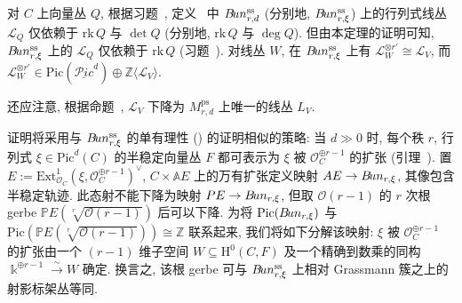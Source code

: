 \begin{remark}\label{src:9.4.37}
对 $C$ 上向量丛 $Q$, 根据习题~, 定义~ 中 $B\!un_{r,d}^{\mathrm{ss}}$ (分别地, $B\!un_{r,\xi}^{\mathrm{ss}}$) 上的行列式线丛 $\mathcal L_Q$ 仅依赖于 $\mathrm{rk}\,Q$ 与 $\det Q$ (分别地, $\mathrm{rk}\,Q$ 与 $\deg Q$). 但由本定理的证明可知, $B\!un_{r,\xi}^{\mathrm{ss}}$ 上的 $\mathcal L_Q$ 仅依赖于 $\mathrm{rk}\,Q$ (习题~). 对线丛 $W$, 在 $B\!un_{r,\xi}^{\mathrm{ss}}$ 上有 $\mathcal L_W^{\otimes r'}\cong\mathcal L_V$, 而 $\mathcal L_W^{\otimes r'}\in\mathrm{Pic}(\underline{\mathcal P\!ic}^d)\oplus\mathbb Z\langle\mathcal L_V\rangle$.
\end{remark}
还应注意, 根据命题~, $\mathcal L_V$ 下降为 $M_{r,d}^{\mathrm{ps}}$ 上唯一的线丛 $L_V$.

证明将采用与 $B\!un_{r,\xi}^{\mathrm{ss}}$ 的单有理性 () 的证明相似的策略: 当 $d\gg0$ 时, 每个秩 $r$, 行列式 $\xi\in\mathrm{Pic}^d(C)$ 的半稳定向量丛 $F$ 都可表示为 $\xi$ 被 $\mathcal O_C^{\oplus r-1}$ 的扩张 (引理~). 置 $E:=\mathrm{Ext}^1_{\mathcal O_C}(\xi,\mathcal O_C^{\oplus r-1})^\vee$, $C\times\mathbb AE$ 上的万有扩张定义映射 $AE\to B\!un_{r,\xi}$, 其像包含半稳定轨迹. 此态射不能下降为映射 $PE\to B\!un_{r,\xi}$, 但取 $\mathcal O(r-1)$ 的 $r$ 次根 gerbe $\mathbb PE(\sqrt[r]{\mathcal O(r-1)})$ 后可以下降. 为将 $\mathrm{Pic}(B\!un_{r,\xi})$ 与 $\mathrm{Pic}(\mathbb PE(\sqrt[r]{\mathcal O(r-1)}))\cong\mathbb Z$ 联系起来, 我们将如下分解该映射: $\xi$ 被 $\mathcal O_C^{\oplus r-1}$ 的扩张由一个 $(r-1)$ 维子空间 $W\subseteq\mathrm H^0(C,F)$ 及一个精确到数乘的同构 $\Bbbk^{\oplus r-1}\xrightarrow{\sim}W$ 确定. 换言之, 该根 gerbe 可与 $B\!un_{r,\xi}^{\mathrm{ss}}$ 上相对 Grassmann 簇之上的射影标架丛等同.
